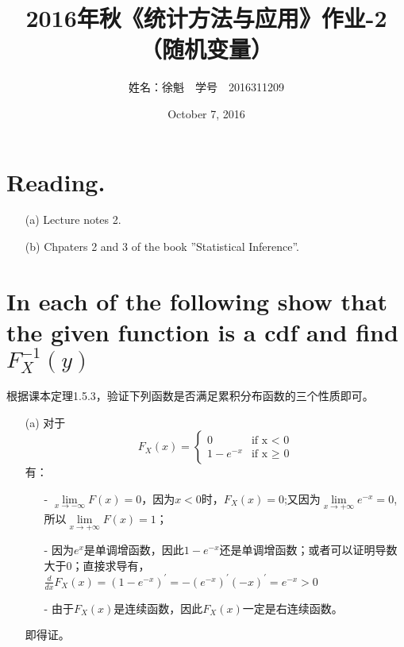 \documentclass [12pt]{article}
\begin{document}
 \begin{CJK*}{GBK}{kai}
\newtheorem{theorem}{定理}
\newtheorem{definition}{定义}
\newtheorem{lemma}{引理}
\newtheorem{corollary}{推论}
\newtheorem{proposition}{性质}
\newtheorem{example}{例}
\newtheorem{remark}{注}
    \title{2016年秋《统计方法与应用》作业-2（随机变量）}
    \author{ 姓名：徐魁\,\,\,\, 学号~~{2016311209}}
    \date{October 7, 2016}
\maketitle

\section{Reading. }
\begin{enumerate}
  \item[(a)] Lecture notes 2.
 \item[(b)] Chpaters 2 and 3 of the book ”Statistical Inference”.\\
 
\end{enumerate}

\section{In each of the following show that the given function is a cdf and find $F_{X}^{-1}{(y)}$}
根据课本定理1.5.3，验证下列函数是否满足累积分布函数的三个性质即可。
\begin{enumerate}
  \item[(a)]  对于
$$F_{X}(x)=
\begin{cases}
0& \text{if x < 0}\\
1- e^{-x} & \text{if x $\ge$ 0}
\end{cases}$$
有：
\begin{itemize}
\item[-] $\lim\limits_{x \to -\infty }F(x) = 0$，因为$x<0$时，$F_{X}(x)=0$;又因为$\lim\limits_{x \to +\infty }e^{-x} = 0$, 所以$\lim\limits_{x \to +\infty }F(x) = 1$；
\item[-] 因为$e^x$是单调增函数，因此$1 - e^{-x}$还是单调增函数；或者可以证明导数大于0；直接求导有，$\frac{d}{dx}F_{X}(x)=(1-e^{-x})^{'}=-(e^{-x})^{'}(-x)^{'}=e^{-x} >0$
\item[-] 由于$F_{X}(x)$是连续函数，因此$F_{X}(x)$一定是右连续函数。
\end{itemize}
即得证。\\


\end{enumerate}
\end{CJK*}
\end{document}
